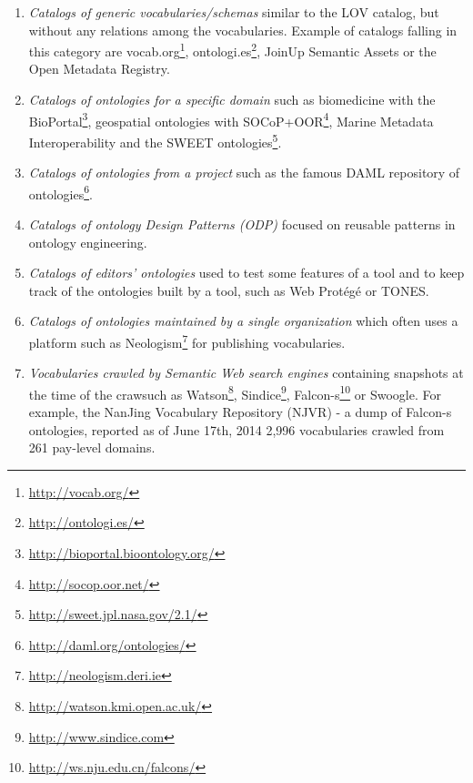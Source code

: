 \begin{enumerate}
 \item \textit{Catalogs of generic vocabularies/schemas} similar to the LOV catalog, but without any relations among the vocabularies. Example of catalogs falling in this category are vocab.org\footnote{\url{http://vocab.org/}}, ontologi.es\footnote{\url{http://ontologi.es/}}, JoinUp Semantic Assets or the Open Metadata Registry.
 \item \textit{Catalogs of ontologies for a specific domain} such as biomedicine with the BioPortal\footnote{\url{http://bioportal.bioontology.org/}}, geospatial ontologies with SOCoP+OOR\footnote{\url{http://socop.oor.net/}}, Marine Metadata Interoperability and the SWEET ontologies\footnote{\url{http://sweet.jpl.nasa.gov/2.1/}}.
 \item \textit{Catalogs of ontologies from a project} such as the famous DAML repository of ontologies\footnote{\url{http://daml.org/ontologies/}}.
 \item \textit{Catalogs of ontology Design Patterns (ODP)} focused on reusable patterns in ontology engineering.
 \item \textit{Catalogs of editors' ontologies} used to test some features of a tool and to keep track of the ontologies built by a tool, such as Web Prot\'{e}g\'{e} or TONES.
 \item \textit{Catalogs of ontologies maintained by a single organization} which often uses a platform such as Neologism\footnote{\url{http://neologism.deri.ie}} for publishing vocabularies.
 \item \textit{Vocabularies crawled by Semantic Web search engines} containing snapshots at the time of the crawsuch as Watson\footnote{\url{http://watson.kmi.open.ac.uk/}}, Sindice\footnote{\url{http://www.sindice.com}}, Falcon-s\footnote{\url{http://ws.nju.edu.cn/falcons/}} or Swoogle. For example, the NanJing Vocabulary Repository (NJVR) - a dump of Falcon-s ontologies, reported as of June 17th, 2014 2,996 vocabularies crawled from 261 pay-level domains.
\end{enumerate}

